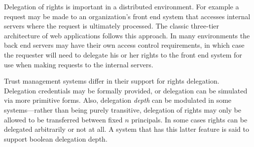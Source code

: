 Delegation of rights is important in a distributed environment. For example a request may be
made to an organization's front end system that accesses internal servers where the request is
ultimately processed. The classic three-tier architecture of web applications follows this
approach. In many environments the back end servers may have their own access control
requirements, in which case the requester will need to delegate his or her rights to the front
end system for use when making requests to the internal servers.

Trust management systems differ in their support for rights delegation. Delegation credentials
may be formally provided, or delegation can be simulated via more primitive forms. Also,
delegation \emph{depth} can be modulated in some systems---rather than being purely transitive,
delegation of rights may only be allowed to be transferred between fixed $n$ principals. In some
cases rights can be delegated arbitrarily or not at all. A system that has this latter feature
is said to support boolean delegation depth.

%
%

